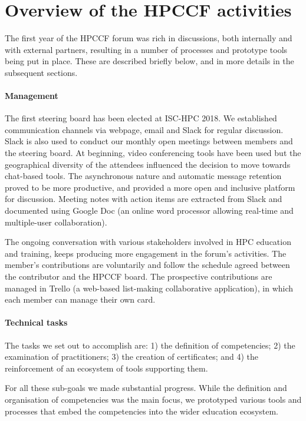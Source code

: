 \documentclass[jocse]{jocseart}
\begin{document}
\section{Overview of the HPCCF activities}
\label{sec:status}

The first year of the HPCCF forum was rich in discussions, both internally and with external partners, resulting in a number of processes and prototype tools being put in place.
These are described briefly below, and in more details in the subsequent sections.

\paragraph{Management}
The first steering board has been elected at ISC-HPC 2018.
We established communication channels via webpage, email and Slack for regular discussion.
Slack is also used to conduct our monthly open meetings between members and the steering board.
At beginning, video conferencing tools have been used but the geographical diversity of the attendees influenced the decision to move towards chat-based tools.
The asynchronous nature and automatic message retention proved to be more productive, and provided a more open and inclusive platform for discussion.
Meeting notes with action items are extracted from Slack and documented using Google Doc (an online word processor allowing real-time and multiple-user collaboration).

The ongoing conversation with various stakeholders involved in HPC education and training, keeps producing more engagement in the forum's activities.
The member's contributions are voluntarily and follow the schedule agreed between the contributor and the HPCCF board.
The prospective contributions are managed in Trello (a web-based list-making collaborative application), in which each member can manage their own card.

\paragraph{Technical tasks}
The tasks we set out to accomplish are:  1) the definition of competencies; 2) the examination of practitioners;  3) the creation of certificates; and 4) the reinforcement of an ecosystem of tools supporting them.

For all these sub-goals we made substantial progress.
While the definition and organisation of competencies was the main focus, we prototyped various tools and processes that embed the competencies into the wider education ecosystem.
\end{document}
